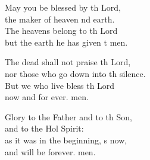 \begin{psalmverse}
\begin{patverse}
May you be blessed by th Lord,\Med\\
the maker of heaven nd earth.\\
The heavens belong to th Lord\Med\\
but the earth he has given t men.

The dead shall not praise th Lord,\Med\\
nor those who go down into th silence.\\
But we who live bless th Lord\Med\\
now and for ever. men.

Glory to the Father and to th Son,\Med\\
and to the Hol Spirit:\\
as it was in the beginning, \pointup{\i}s now,\Med\\
and will be forever. men. 
  \end{patverse}
\end{psalmverse}
